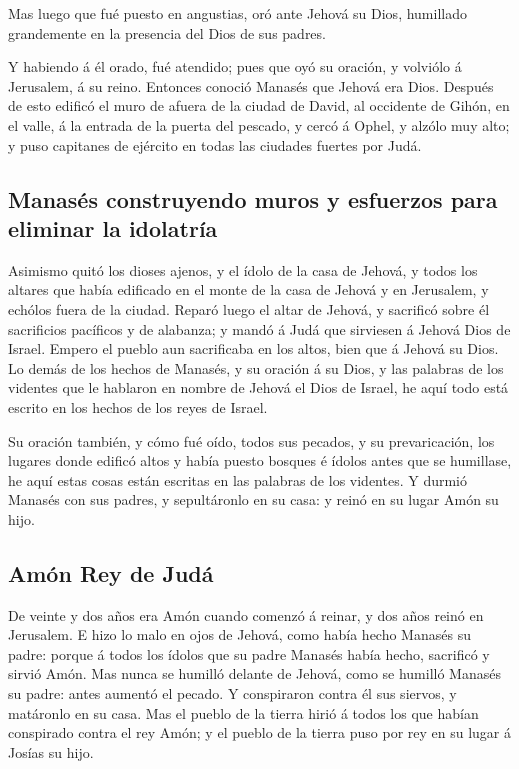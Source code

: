  Mas luego que fué puesto en angustias, oró ante Jehová
su Dios, humillado grandemente en la presencia del Dios de sus padres.

 Y habiendo á él orado, fué atendido; pues que oyó su
oración, y volviólo á Jerusalem, á su reino. Entonces conoció Manasés
que Jehová era Dios.  Después de esto edificó el muro de
afuera de la ciudad de David, al occidente de Gihón, en el valle, á la
entrada de la puerta del pescado, y cercó á Ophel, y alzólo muy alto; y
puso capitanes de ejército en todas las ciudades fuertes por Judá.

\hypertarget{manasuxe9s-construyendo-muros-y-esfuerzos-para-eliminar-la-idolatruxeda}{%
\subsection{Manasés construyendo muros y esfuerzos para eliminar la
idolatría}\label{manasuxe9s-construyendo-muros-y-esfuerzos-para-eliminar-la-idolatruxeda}}

 Asimismo quitó los dioses ajenos, y el ídolo de la casa
de Jehová, y todos los altares que había edificado en el monte de la
casa de Jehová y en Jerusalem, y echólos fuera de la ciudad.
 Reparó luego el altar de Jehová, y sacrificó sobre él
sacrificios pacíficos y de alabanza; y mandó á Judá que sirviesen á
Jehová Dios de Israel.  Empero el pueblo aun sacrificaba
en los altos, bien que á Jehová su Dios.  Lo demás de los
hechos de Manasés, y su oración á su Dios, y las palabras de los
videntes que le hablaron en nombre de Jehová el Dios de Israel, he aquí
todo está escrito en los hechos de los reyes de Israel.

 Su oración también, y cómo fué oído, todos sus pecados,
y su prevaricación, los lugares donde edificó altos y había puesto
bosques é ídolos antes que se humillase, he aquí estas cosas están
escritas en las palabras de los videntes.  Y durmió
Manasés con sus padres, y sepultáronlo en su casa: y reinó en su lugar
Amón su hijo.

\hypertarget{amuxf3n-rey-de-juduxe1}{%
\subsection{Amón Rey de Judá}\label{amuxf3n-rey-de-juduxe1}}

 De veinte y dos años era Amón cuando comenzó á reinar, y
dos años reinó en Jerusalem.  E hizo lo malo en ojos de
Jehová, como había hecho Manasés su padre: porque á todos los ídolos que
su padre Manasés había hecho, sacrificó y sirvió Amón. 
Mas nunca se humilló delante de Jehová, como se humilló Manasés su
padre: antes aumentó el pecado.  Y conspiraron contra él
sus siervos, y matáronlo en su casa.  Mas el pueblo de la
tierra hirió á todos los que habían conspirado contra el rey Amón; y el
pueblo de la tierra puso por rey en su lugar á Josías su hijo.

